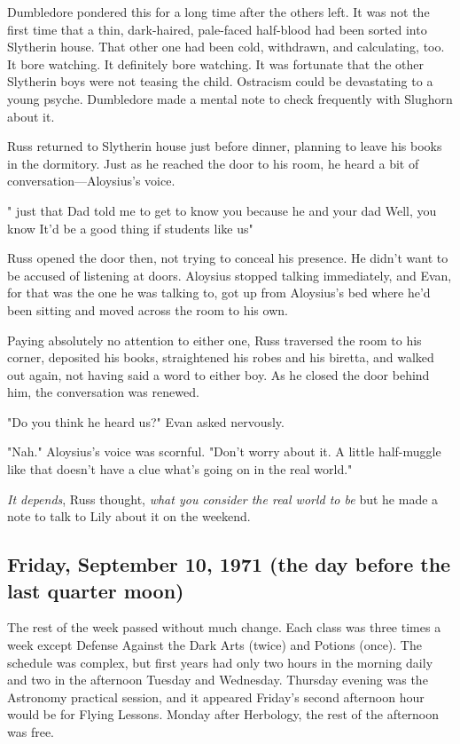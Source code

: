 Dumbledore pondered this for a long time after the others left. It was not the first time that a thin, dark-haired, pale-faced half-blood had been sorted into Slytherin house. That other one had been cold, withdrawn, and calculating, too. It bore watching. It definitely bore watching. It was fortunate that the other Slytherin boys were not teasing the child. Ostracism could be devastating to a young psyche. Dumbledore made a mental note to check frequently with Slughorn about it.

Russ returned to Slytherin house just before dinner, planning to leave his books in the dormitory. Just as he reached the door to his room, he heard a bit of conversation—Aloysius's voice.

"{\el} just that Dad told me to get to know you because he and your dad{\el} Well, you know{\el} It'd be a good thing if students like us{\el}"

Russ opened the door then, not trying to conceal his presence. He didn't want to be accused of listening at doors. Aloysius stopped talking immediately, and Evan, for that was the one he was talking to, got up from Aloysius's bed where he'd been sitting and moved across the room to his own.

Paying absolutely no attention to either one, Russ traversed the room to his corner, deposited his books, straightened his robes and his biretta, and walked out again, not having said a word to either boy. As he closed the door behind him, the conversation was renewed.

"Do you think he heard us?" Evan asked nervously.

"Nah." Aloysius's voice was scornful. "Don't worry about it. A little half-muggle like that doesn't have a clue what's going on in the real world."

\emph{It depends}, Russ thought, \emph{what you consider the real world to be}{\el} but he made a note to talk to Lily about it on the weekend.

\subsection{Friday, September 10, 1971 (the day before the last quarter moon)}

The rest of the week passed without much change. Each class was three times a week except Defense Against the Dark Arts (twice) and Potions (once). The schedule was complex, but first years had only two hours in the morning daily and two in the afternoon Tuesday and Wednesday. Thursday evening was the Astronomy practical session, and it appeared Friday's second afternoon hour would be for Flying Lessons. Monday after Herbology, the rest of the afternoon was free.

